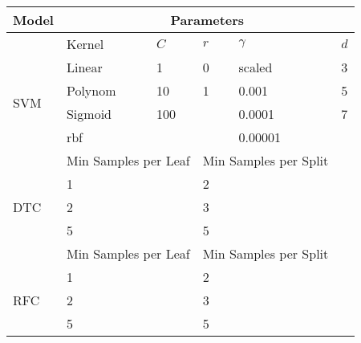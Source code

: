 \begin{table}
    \centering
    \label{tab:grid_search_params}
    \begin{tabular}{p{} | p{}p{}p{}p{}p{}}
        \textbf{Model} & \multicolumn{5}{c}{\textbf{Parameters}}\\
        \hline
                                & Kernel        & $C$     & $r$ & $\gamma$  & $d$\\
        \hline    
        \multirow{4}{*}{SVM}    & Linear        & 1     & 0     & scaled    & 3\\
                                & Polynom       & 10    & 1     & 0.001     & 5\\
                                & Sigmoid       & 100   &       & 0.0001    & 7\\
                                & rbf           &       &       & 0.00001   &\\
        \hline
                & \multicolumn{2}{l}{Min Samples per Leaf} & \multicolumn{2}{l}{Min Samples per Split} \\
        \hline
        \multirow{3}{*}{DTC}    & \multicolumn{2}{l}{1} & \multicolumn{2}{l}{2} \\
                                & \multicolumn{2}{l}{2} & \multicolumn{2}{l}{3} \\
                                & \multicolumn{2}{l}{5} & \multicolumn{2}{l}{5} \\
        \hline
                & \multicolumn{2}{l}{Min Samples per Leaf} & \multicolumn{2}{l}{Min Samples per Split}\\
        \hline
        \multirow{3}{*}{RFC}    & \multicolumn{2}{l}{1} & \multicolumn{2}{l}{2} \\
                                & \multicolumn{2}{l}{2} & \multicolumn{2}{l}{3}\\
                                & \multicolumn{2}{l}{5} & \multicolumn{2}{l}{5}\\
    \end{tabular}
\end{table}